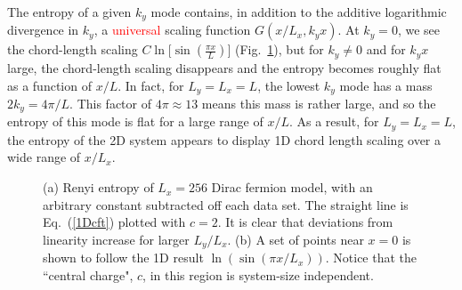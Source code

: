 \documentclass[prb,aps,twocolumn,floatfix,amsmath,amssymb,superscriptaddress,tightenlines]{revtex4}
\begin{document}
The entropy of a given $k_y$ mode contains, in addition to the additive logarithmic divergence in $k_y$, a \textcolor{red}{universal} scaling function $G(x/L_x,k_y x)$.  At $k_y=0$, we see the chord-length scaling $C \ln \big[\sin ( \frac{\pi x}{L} ) \big]$ (Fig.~\ref{fig:dirac}), but for $k_y \neq 0$ and for $k_y x$ large, the chord-length scaling disappears and the entropy becomes roughly flat as a function of $x/L$.  In fact, for $L_y=L_x=L$, the lowest $k_y$ mode has a mass $2 k_y=4\pi/L$. This factor of $4\pi\approx 13$ means this mass is rather large, and so the entropy of this mode is flat for a large range of $x/L$.  As a result, for $L_y=L_x=L$, the entropy of the 2D system appears to display 1D chord length scaling over a wide range of $x/L_x$.

 \begin{figure}
   \begin{center}
   \end{center}
   \caption{(a) Renyi entropy of $L_x=256$ Dirac fermion model, with an arbitrary constant subtracted off each data set.
    The straight line is Eq.~(\ref{1Dcft}) plotted with $c=2$.
    It is clear that deviations from linearity increase for larger $L_y/L_x$. (b) A set of points near $x = 0$ is shown to follow the 1D result $\ln(\sin(\pi x/L_x))$. Notice that the ``central charge", $c$, in this region is system-size independent.
   }
   \label{fig:dirac}
 \end{figure}
 
\end{document}
